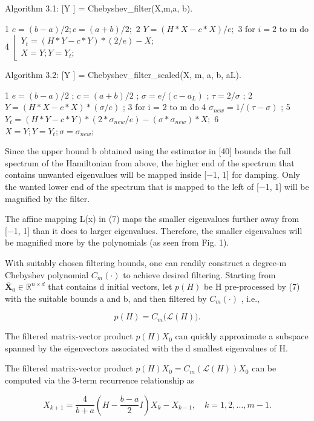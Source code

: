 \documentclass[
  10
]{article}
\begin{document}
Algorithm 3.1: {[}Y {]} = Chebyshev\_filter(X,m,a, b).

1 \(e = (b - a) / 2; c = (a + b) / 2;\) 2 \(Y = (H*X - c*X) / e;\) 3 for
\(i = 2\) to m do\\
4
\(\left\lfloor \begin{array}{l}Y_{t} = (H * Y - c * Y)*(2 / e) - X;\\ X = Y;Y = Y_{t}; \end{array} \right.\)

Algorithm 3.2: {[}Y {]} = Chebyshev\_filter\_scaled(X, m, a, b, aL).

1 \(e = (b - a)/2\) ; \(c = (a + b)/2\) ; \(\sigma = e/(c - a_{L})\) ;
\(\tau = 2/\sigma\) ; 2 \(Y = (H * X - c * X) * (\sigma / e)\) ; 3 for i
= 2 to m do 4 \(\sigma_{new} = 1/(\tau - \sigma)\) ; 5
\(Y_{t} = (H * Y - c * Y) * (2 * \sigma_{new}/e) - (\sigma * \sigma_{new}) * X;\)
6 \(X = Y; Y = Y_{t}; \sigma = \sigma_{new};\)

Since the upper bound b obtained using the estimator in {[}40{]} bounds
the full spectrum of the Hamiltonian from above, the higher end of the
spectrum that contains unwanted eigenvalues will be mapped inside {[}−1,
1{]} for damping. Only the wanted lower end of the spectrum that is
mapped to the left of {[}−1, 1{]} will be magnified by the filter.

The affine mapping L(x) in (7) maps the smaller eigenvalues further away
from {[}−1, 1{]} than it does to larger eigenvalues. Therefore, the
smaller eigenvalues will be magnified more by the polynomials (as seen
from Fig. 1).

With suitably chosen filtering bounds, one can readily construct a
degree-m Chebyshev polynomial \(C _ { m } ( \cdot )\) to achieve desired
filtering. Starting from
\(\bar { \boldsymbol { X } } _ { 0 } \in \mathbb { R } ^ { n \times d }\)
that contains d initial vectors, let \(p ( H )\) be H pre-processed by
(7) with the suitable bounds a and b, and then filtered by
\(C _ { m } ( \cdot )\) , i.e.,

\[
p (H) = C _ {m} \big (\mathcal {L} (H) \big).
\]

The filtered matrix-vector product \(p ( H ) X _ { 0 }\) can quickly
approximate a subspace spanned by the eigenvectors associated with the d
smallest eigenvalues of H.

The filtered matrix-vector product
\(p ( H ) X _ { 0 } = C _ { m } ( { \mathcal { L } } ( H ) ) X _ { 0 }\)
can be computed via the 3-term recurrence relationship as

\[
X _ {k + 1} = \frac {4}{b + a} \left(H - \frac {b - a}{2} I\right) X _ {k} - X _ {k - 1}, \quad k = 1, 2, \dots , m - 1. \tag {8}
\]
\end{document}
